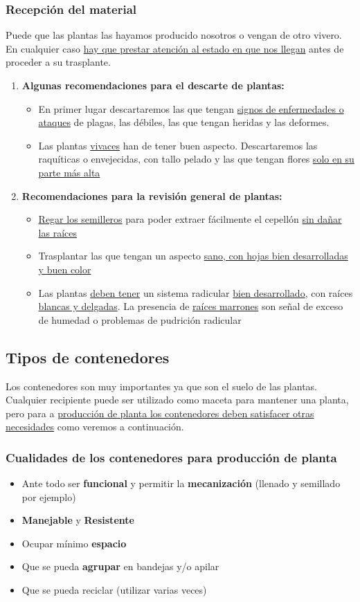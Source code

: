 \documentclass[a4paper,12pt,oneside]{article}
\begin{document}
\subsubsection{Recepción del material}
\label{sec:org4984873}
Puede que las plantas las hayamos producido nosotros o vengan de otro
vivero. En cualquier caso \uline{hay que prestar atención al estado en que nos
llegan} antes de proceder a su trasplante.
\begin{enumerate}
\item \textbf{Algunas recomendaciones para el descarte de plantas:}
\begin{itemize}
\item En primer lugar descartaremos las que tengan \uline{signos de enfermedades o ataques}
de plagas, las débiles, las que tengan heridas y las deformes.
\item Las plantas \uline{vivaces} han de tener buen aspecto. Descartaremos las raquíticas
o envejecidas, con tallo pelado y las que tengan flores \uline{solo en su parte más
alta}
\end{itemize}
\item \textbf{Recomendaciones para la revisión general de plantas:}
\begin{itemize}
\item \uline{Regar los semilleros} para poder extraer fácilmente el cepellón \uline{sin dañar
las raíces}
\item Trasplantar las que tengan un aspecto \uline{sano, con hojas bien desarrolladas
y buen color}
\item Las plantas \uline{deben tener} un sistema radicular \uline{bien desarrollado}, con
raíces \uline{blancas y delgadas}. La presencia de \uline{raíces marrones} son señal de
exceso de humedad o problemas de pudrición radicular
\end{itemize}
\end{enumerate}
\subsection{Tipos de contenedores}
\label{sec:org7f1d4da}
Los contenedores son muy importantes ya que son el suelo de las
plantas. Cualquier recipiente puede ser utilizado como maceta para mantener una
planta, pero para a \uline{producción de planta los contenedores deben satisfacer
otras necesidades} como veremos a continuación.
\subsubsection{Cualidades de los contenedores para producción de planta}
\label{sec:org2c22b64}
\begin{itemize}
\item Ante todo ser \textbf{funcional} y permitir la \textbf{mecanización} (llenado y semillado
por ejemplo)
\item \textbf{Manejable} y \textbf{Resistente}
\item Ocupar mínimo \textbf{espacio}
\item Que se pueda \textbf{agrupar} en bandejas y/o apilar
\item Que se pueda reciclar (utilizar varias veces)
\end{itemize}
\end{document}
